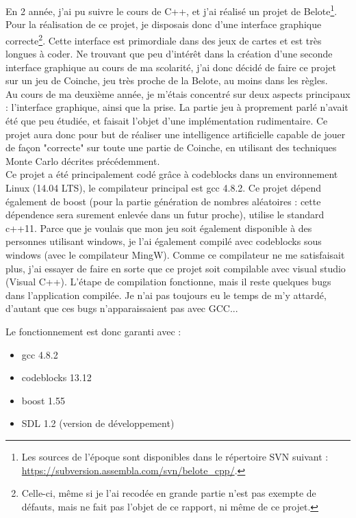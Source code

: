 \documentclass[a4paper,11pt]{article}
\begin{document}
En 2\ieme{} année, j'ai pu suivre le cours de C++, et j'ai réalisé un projet de Belote\footnote{Les sources de l'époque sont disponibles dans le répertoire SVN suivant : \url{https://subversion.assembla.com/svn/belote_cpp/}.}. Pour la réalisation de ce projet, je disposais donc d'une interface graphique correcte\footnote{Celle-ci, même si je l'ai recodée en grande partie n'est pas exempte de défauts, mais ne fait pas l'objet de ce rapport, ni même de ce projet.}. Cette interface est primordiale dans des jeux de cartes et est très longues à coder. Ne trouvant que peu d'intérêt dans la création d'une seconde interface graphique au cours de ma scolarité, j'ai donc décidé de faire ce projet sur un jeu de Coinche, jeu très proche de la Belote, au moins dans les règles. \\
Au cours de ma deuxième année, je m'étais concentré sur deux aspects principaux : l'interface graphique, ainsi que la prise. La partie jeu à proprement parlé n'avait été que peu étudiée, et faisait l'objet d'une implémentation rudimentaire. Ce projet aura donc pour but de réaliser une intelligence artificielle capable de jouer de façon "correcte" sur toute une partie de Coinche, en utilisant des techniques Monte Carlo décrites précédemment. \\

Ce projet a été principalement codé grâce à codeblocks dans un environnement Linux (14.04 LTS), le compilateur principal est gcc 4.8.2. Ce projet dépend également de boost (pour la partie génération de nombres aléatoires : cette dépendence sera surement enlevée dans un futur proche), utilise le standard c++11. Parce que je voulais que mon jeu soit également disponible à des personnes utilisant windows, je l'ai également compilé avec codeblocks sous windows (avec le compilateur MingW). Comme ce compilateur ne me satisfaisait plus, j'ai essayer de faire en sorte que ce projet soit compilable avec visual studio (Visual C++). L'étape de compilation fonctionne, mais il reste quelques bugs dans l'application compilée. Je n'ai pas toujours eu le temps de m'y attardé, d'autant que ces bugs n'apparaissaient pas avec GCC...

Le fonctionnement est donc garanti avec :
\begin{itemize}
\item gcc 4.8.2
\item codeblocks 13.12
\item boost 1.55
\item SDL 1.2 (version de développement)
\end{itemize}
\end{document}
